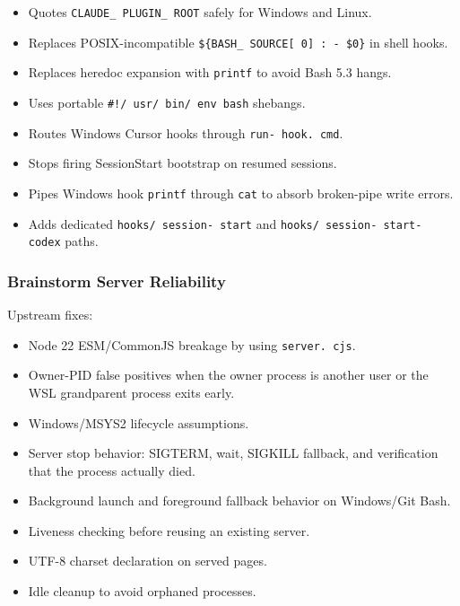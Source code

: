 \documentclass[twocolumn,10pt,letterpaper]{article}
\begin{document}
\begin{itemize}
\setlength{\itemsep}{0pt}
\setlength{\parskip}{0pt}
  \item Quotes \texttt{CLAUDE\_ PLUGIN\_ ROOT} safely for Windows and Linux.
  \item Replaces POSIX-incompatible \texttt{\$\{BASH\_ SOURCE[ 0] : - \$0\}} in shell hooks.
  \item Replaces heredoc expansion with \texttt{printf} to avoid Bash 5.3 hangs.
  \item Uses portable \texttt{\#!/ usr/ bin/ env bash} shebangs.
  \item Routes Windows Cursor hooks through \texttt{run- hook. cmd}.
  \item Stops firing SessionStart bootstrap on resumed sessions.
  \item Pipes Windows hook \texttt{printf} through \texttt{cat} to absorb broken-pipe write errors.
  \item Adds dedicated \texttt{hooks/ session- start} and \texttt{hooks/ session- start- codex} paths.
\end{itemize}

\subsubsection{Brainstorm Server Reliability}

Upstream fixes:


\begin{itemize}
\setlength{\itemsep}{0pt}
\setlength{\parskip}{0pt}
  \item Node 22 ESM/CommonJS breakage by using \texttt{server. cjs}.
  \item Owner-PID false positives when the owner process is another user or the WSL grandparent process exits early.
  \item Windows/MSYS2 lifecycle assumptions.
  \item Server stop behavior: SIGTERM, wait, SIGKILL fallback, and verification that the process actually died.
  \item Background launch and foreground fallback behavior on Windows/Git Bash.
  \item Liveness checking before reusing an existing server.
  \item UTF-8 charset declaration on served pages.
  \item Idle cleanup to avoid orphaned processes.
\end{itemize}
\end{document}
